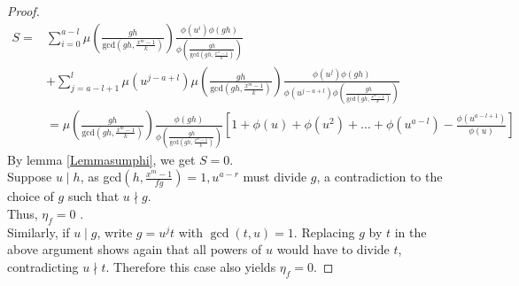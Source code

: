 \documentclass[10pt,a4paper]{amsart}
\begin{document}
\begin{proof}
        \begin{align*}
            S =& \displaystyle \sum_{i=0}^{a-l} \mu \left( \frac{gh}{\text{gcd}(gh,\frac{x^m-1}{k})}\right) \frac{\phi(u^i)\phi(gh)}{\phi\left( \frac{gh}{\text{gcd}(gh,\frac{x^m-1}{k})}\right)} \\&+ \sum_{j=a-l+1}^{l} \mu(u^{j-a+l})  \mu \left( \frac{gh}{\text{gcd}(gh,\frac{x^m-1}{k})}\right) \frac{\phi(u^j)\phi(gh)}{\phi(u^{j-a+l})\phi\left( \frac{gh}{\text{gcd}(gh,\frac{x^m-1}{k})}\right)}   \\
            &= \mu \left( \frac{gh}{\text{gcd}(gh,\frac{x^m-1}{k})}\right) \frac{\phi(gh)}{\phi\left( \frac{gh}{\text{gcd}(gh,\frac{x^m-1}{k})}\right)}\left[1+\phi(u)+\phi(u^2)+\dots+ \phi(u^{a-l})-\frac{\phi(u^{a-l+1})}{\phi(u)}\right]
        \end{align*}
        By lemma \ref{Lemmasumphi}, we get $S=0$.\\
        
        Suppose $u \mid h$, as gcd$(h,\frac{x^m-1}{fg}) = 1, u^{a-r}$ must divide $g$, a contradiction to the choice of $g$ such that $u \nmid g$.\\           
        Thus, $\eta_f = 0$ .\\
        Similarly, if $u \mid g$, write $g = u^j t$ with $\gcd(t,u)=1$.  Replacing $g$ by $t$ in the above argument shows again that all powers of $u$ would have to divide $t$, contradicting $u\nmid t$.  Therefore this case also yields $\eta_f = 0$.

     \end{proof}
\end{document}
